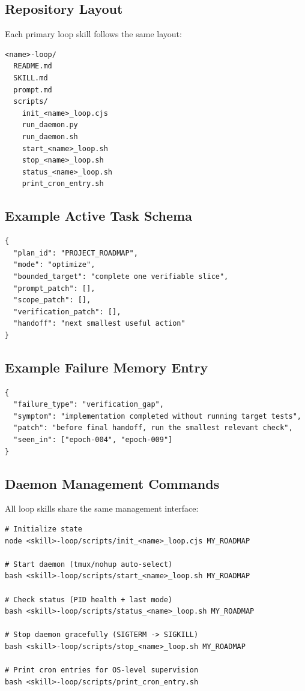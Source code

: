 \subsection{Repository Layout}

Each primary loop skill follows the same layout:
\begin{verbatim}
<name>-loop/
  README.md
  SKILL.md
  prompt.md
  scripts/
    init_<name>_loop.cjs
    run_daemon.py
    run_daemon.sh
    start_<name>_loop.sh
    stop_<name>_loop.sh
    status_<name>_loop.sh
    print_cron_entry.sh
\end{verbatim}

\subsection{Example Active Task Schema}

\begin{verbatim}
{
  "plan_id": "PROJECT_ROADMAP",
  "mode": "optimize",
  "bounded_target": "complete one verifiable slice",
  "prompt_patch": [],
  "scope_patch": [],
  "verification_patch": [],
  "handoff": "next smallest useful action"
}
\end{verbatim}

\subsection{Example Failure Memory Entry}

\begin{verbatim}
{
  "failure_type": "verification_gap",
  "symptom": "implementation completed without running target tests",
  "patch": "before final handoff, run the smallest relevant check",
  "seen_in": ["epoch-004", "epoch-009"]
}
\end{verbatim}

\subsection{Daemon Management Commands}

All loop skills share the same management interface:

\begin{verbatim}
# Initialize state
node <skill>-loop/scripts/init_<name>_loop.cjs MY_ROADMAP

# Start daemon (tmux/nohup auto-select)
bash <skill>-loop/scripts/start_<name>_loop.sh MY_ROADMAP

# Check status (PID health + last mode)
bash <skill>-loop/scripts/status_<name>_loop.sh MY_ROADMAP

# Stop daemon gracefully (SIGTERM -> SIGKILL)
bash <skill>-loop/scripts/stop_<name>_loop.sh MY_ROADMAP

# Print cron entries for OS-level supervision
bash <skill>-loop/scripts/print_cron_entry.sh
\end{verbatim}

